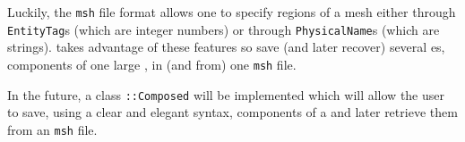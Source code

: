 Luckily, the {\small\tt msh} file format allows one to specify regions of a mesh
either through {\small\tt EntityTag}s (which are integer numbers)
or through {\small\tt PhysicalName}s (which are strings).
{\ManiFEM} takes advantage of these features so save (and later recover) several
{\small\tt{}}es, components of one large {\small\tt{}}, in (and from)
one {\small\tt msh} file.

In the future, a class {\small\tt{}::Composed} will be implemented which will
allow the user to save, using a clear and elegant syntax, components of a {\small\tt{}}
and later retrieve them  from an {\small\tt msh} file.

